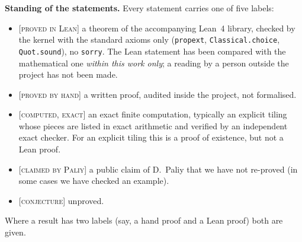 \documentclass[11pt,reqno]{amsart}
\theoremstyle{plain}
\theoremstyle{definition}
\newcommand{\lab}[1]{\textup{[\textsc{#1}]}}
\newcommand{\PL}{\lab{proved in Lean}}
\newcommand{\PH}{\lab{proved by hand}}
\newcommand{\CE}{\lab{computed, exact}}
\newcommand{\CP}{\lab{claimed by Paliy}}
\newcommand{\CJ}{\lab{conjecture}}
\begin{document}
\medskip\noindent\textbf{Standing of the statements.}
Every statement carries one of five labels:
\begin{itemize}\itemsep1pt
\item \PL{} a theorem of the accompanying Lean~4 library, checked by the kernel with the standard axioms only (\texttt{propext}, \texttt{Classical.choice}, \texttt{Quot.sound}), no \texttt{sorry}. The Lean statement has been compared with the mathematical one \emph{within this work only}; a reading by a person outside the project has not been made.
\item \PH{} a written proof, audited inside the project, not formalised.
\item \CE{} an exact finite computation, typically an explicit tiling whose pieces are listed in exact arithmetic and verified by an independent exact checker. For an explicit tiling this is a proof of existence, but not a Lean proof.
\item \CP{} a public claim of D.~Paliy that we have not re-proved (in some cases we have checked an example).
\item \CJ{} unproved.
\end{itemize}
Where a result has two labels (say, a hand proof and a Lean proof) both are given.
\end{document}
